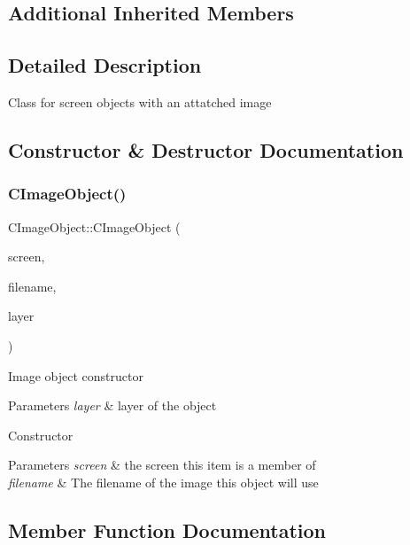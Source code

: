\subsection*{Additional Inherited Members}


\subsection{Detailed Description}
Class for screen objects with an attatched image 

\subsection{Constructor \& Destructor Documentation}
\mbox{\label{class_c_image_object_a64d5b8b5fa0709c28aa114c24b736419}} 
\subsubsection{\texorpdfstring{CImageObject()}{CImageObject()}}
{\footnotesize\ttfamily C\+Image\+Object\+::\+C\+Image\+Object (\begin{DoxyParamCaption}\item[{\mbox{\hyperlink{class_c_screen}{C\+Screen}} $\ast$}]{screen,  }\item[{const std\+::wstring \&}]{filename,  }\item[{\mbox{\hyperlink{_screen_layers_8h_ac283065f0e546466dc00cf224c28d5ac}{Screen\+Layers}}}]{layer }\end{DoxyParamCaption})\hspace{0.3cm}{\ttfamily [protected]}}

Image object constructor 
\begin{DoxyParams}{Parameters}
{\em layer} & layer of the object\\
\hline
\end{DoxyParams}
Constructor 
\begin{DoxyParams}{Parameters}
{\em screen} & the screen this item is a member of \\
\hline
{\em filename} & The filename of the image this object will use \\
\hline
\end{DoxyParams}


\subsection{Member Function Documentation}
\mbox{\label{class_c_image_object_a7130a9fa130c2028aba6c28dcfc876d5}} 

